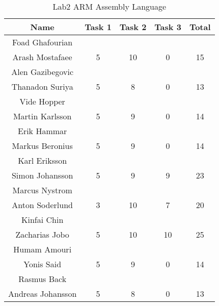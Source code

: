 \documentclass{article}
\begin{document}
\begin{table}[ht]
\caption{Lab2 ARM Assembly Language}
\centering
\begin{tabular}{c c c c c} 
\hline\hline 
Name & Task 1 & Task 2 & Task 3 & Total \\ [0.5ex] 
\hline
Foad Ghafourian \\ Arash Mostafaee 
& 5 & 10 & 0 & 15 \\
\hline
Alen Gazibegovic \\ Thanadon Suriya & 
5 & 8 & 0 & 13 \\
\hline 
Vide Hopper \\ Martin Karlsson
& 5 & 9 & 0 & 14 \\
\hline
Erik Hammar \\ Markus Beronius
& 5 & 9 & 0 & 14 \\
\hline 
Karl Eriksson \\ Simon Johansson
& 5 & 9 & 9 & 23 \\ 
\hline
Marcus Nystrom \\ Anton Soderlund
& 3 & 10 & 7 & 20 \\ 
\hline
Kinfai Chin \\ Zacharias Jobo
& 5 & 10 & 10 & 25 \\
\hline
Humam Amouri \\ Yonis Said
& 5 & 9 & 0 & 14 \\
\hline
Rasmus Back \\ Andreas Johansson
& 5 & 8 & 0 & 13 \\ [1ex]
\hline
\end{tabular}
\label{table:nonlin}
\end{table}
 
\end{document}
